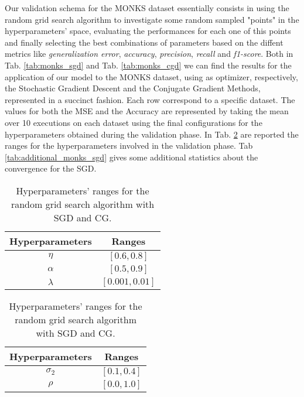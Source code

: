         Our validation schema for the MONKS dataset essentially consists in using the random grid
        search
        algorithm to investigate some random sampled "points" in the hyperparameters' space, evaluating the
        performances for each one of this points and finally selecting the best combinations of parameters
        based
        on the diffent metrics like \textit{generalization error}, \textit{accuracy}, \textit{precision},
        \textit{recall} and \textit{f1-score}. Both in Tab. \ref{tab:monks_sgd} and Tab.
        \ref{tab:monks_cgd} we can find the results for the application of our model to the MONKS dataset,
        using as optimizer, respectively, the Stochastic Gradient Descent and the Conjugate Gradient Methods,
        represented in a succinct fashion. Each row correspond to a specific dataset. The values for both the
        MSE and the Accuracy are represented by taking the mean over 10 executions on each dataset using
        the final configurations for the hyperparameters obtained during the validation phase.
        In Tab. \ref{tab:hyper_monk} are reported the ranges for the hyperparameters involved in the validation phase. Tab \ref{tab:additional_monks_sgd} gives some additional statistics about the convergence for the
        SGD.

        \begin{table}[H]
          \centering
          \caption{Hyperparameters' ranges for the random grid search algorithm with SGD and CG.}
          \begin{minipage}{.4\textwidth}
              \centering
              \begin{tabular}{| c | c |}
                    \hline
                    Hyperparameters & Ranges\\
                    \hline
                    $\eta$ & $\left [0.6, 0.8 \right ]$ \\
                    \hline
                    $\alpha$ & $[0.5, 0.9]$ \\
                    \hline
                    $\lambda$ & $[0.001, 0.01]$ \\
                    \hline
              \end{tabular}
          \end{minipage}
          \begin{minipage}{.4\textwidth}
              \centering
              \begin{tabular}{| c | c |}
                    \hline
                    Hyperparameters & Ranges\\
                    \hline
                    $\sigma_2$ & $\left [0.1, 0.4 \right ]$ \\
                    \hline
                    $\rho$ & $[0.0, 1.0]$ \\
                    \hline
              \end{tabular}
            \end{minipage}
            \label{tab:hyper_monk}
        \end{table}

